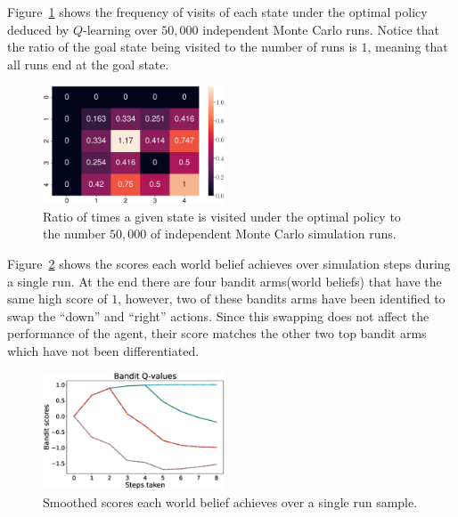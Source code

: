 Figure~\ref{fig:visit_count} shows the frequency of visits of each state under
the optimal policy deduced by $Q$-learning over $50,000$ independent Monte Carlo
runs. Notice that the ratio of the goal state being visited to the number of
runs is $1$, meaning that all runs end at the goal state.
%
\begin{figure}[bth]
    \centering
    \includegraphics[width=0.48\textwidth]{./figures/visit_count_ratio.eps}
    \caption{Ratio of times a given state is visited under the optimal policy to the number $50,000$ of independent Monte Carlo simulation runs.}
    \label{fig:visit_count}
\end{figure}

Figure~\ref{fig:bandit_scores} shows the scores each world belief achieves over
simulation steps during a single run. At the end there are four bandit
arms(world beliefs) that have the same high score of $1$, however, two of these
bandits arms have been identified to swap the ``down'' and ``right'' actions.
Since this swapping does not affect the performance of the agent, their score
matches the other two top bandit arms which have not been differentiated.
%
\begin{figure}[bth]
    \centering
    \includegraphics[width=0.48\textwidth]{./figures/bandit_scores.eps}
    \caption{Smoothed scores each world belief achieves over a single run sample.}
    \label{fig:bandit_scores}
\end{figure}